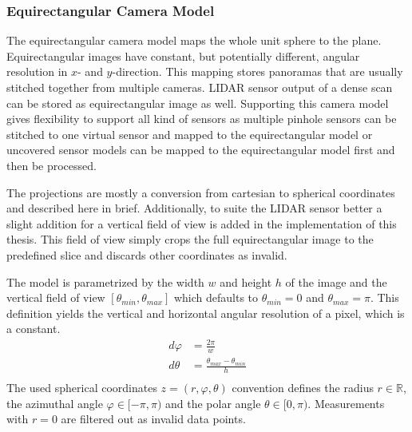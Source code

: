 \subsubsection{Equirectangular Camera Model}

The equirectangular camera model maps the whole unit sphere to the plane.
Equirectangular images have constant, but potentially different, angular resolution in $x$- and $y$-direction.
This mapping stores panoramas that are usually stitched together from multiple cameras.
\acrshort{LIDAR} sensor output of a dense scan can be stored as equirectangular image as well.
Supporting this camera model gives flexibility to support all kind of sensors as multiple pinhole sensors can be stitched to one virtual sensor and mapped to the equirectangular model or uncovered sensor models can be mapped to the equirectangular model first and then be processed.

\begin{figure}[H]
    
\end{figure}

The projections are mostly a conversion from cartesian to spherical coordinates and described here in brief.
Additionally, to suite the \acrshort{LIDAR} sensor better a slight addition for a vertical field of view is added in the implementation of this thesis.
This field of view simply crops the full equirectangular image to the predefined slice and discards other coordinates as invalid.

The model is parametrized by the width $w$ and height $h$ of the image and the vertical field of view $[\theta_{min}, \theta_{max}]$ which defaults to $\theta_{min} = 0$ and $\theta_{max} = \pi$.
This definition yields the vertical and horizontal angular resolution of a pixel, which is a constant.
\begin{equation}
\label{eq:equi_angular_resolution}
\begin{aligned}
    d\varphi &= \frac{2 \pi}{w} \\
    d\theta &= \frac{\theta_{max} - \theta_{min}}{h} \\
\end{aligned}
\end{equation}
The used spherical coordinates $z = (r, \varphi, \theta)$ convention defines the radius $r \in \mathbb{R}$, the azimuthal angle $\varphi \in [-\pi, \pi)$ and the polar angle $\theta \in [0, \pi)$.
Measurements with $r = 0$ are filtered out as invalid data points.

